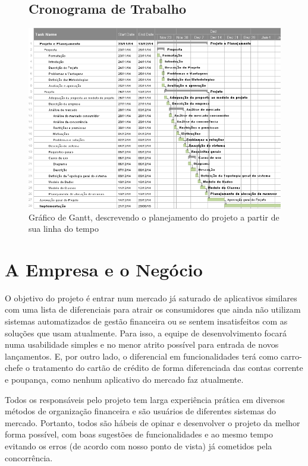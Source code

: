 \documentclass[a4paper]{abnt}
\begin{document}
\begin{figure}[!hp]
	\section{Cronograma de Trabalho}
	\centering
	\includegraphics[scale=0.55]{diagramas/gantt.png}
	\caption{Gráfico de Gantt, descrevendo o planejamento do projeto a partir de sua linha do tempo}
\end{figure}


\chapter{A Empresa e o Negócio}
O objetivo do projeto é entrar num mercado já saturado de aplicativos similares com uma lista de diferenciais para atrair os consumidores que ainda não utilizam sistemas automatizados de gestão financeira ou se sentem insatisfeitos com as soluções que usam atualmente. Para isso, a equipe de desenvolvimento focará numa usabilidade simples e no menor atrito possível para entrada de novos lançamentos. E, por outro lado, o diferencial em funcionalidades terá como carro-chefe o tratamento do cartão de crédito de forma diferenciada das contas corrente e poupança, como nenhum aplicativo do mercado faz atualmente.

Todos os responsáveis pelo projeto tem larga experiência prática em diversos métodos de organização financeira e são usuários de diferentes sistemas do mercado. Portanto, todos são hábeis de opinar e desenvolver o projeto da melhor forma possível, com boas sugestões de funcionalidades e ao mesmo tempo evitando os erros (de acordo com nosso ponto de vista) já cometidos pela concorrência.
\end{document}
